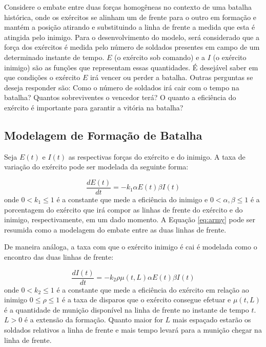 \documentclass{article}
\begin{document}
Considere o embate entre duas forças homogêneas no contexto de uma batalha histórica, onde os exércitos se alinham um de frente para o outro em formação e mantém a posição atirando e substituindo a linha de frente a medida que esta é atingida pelo inimigo. Para o desenvolvimento do modelo, será considerado que a força dos exércitos é medida pelo número de soldados presentes em campo de um determinado instante de tempo. $E$ (o exército sob comando) e a $I$ (o exército inimigo) são as funções que representam essas quantidades. É desejável saber em que condições o exército $E$ irá vencer ou perder a batalha. Outras perguntas se deseja responder são: Como o número de soldados irá cair com o tempo na batalha? Quantos sobreviventes o vencedor terá? O quanto a eficiência do exército é importante para garantir a vitória na batalha?

\subsection{Modelagem de Formação de Batalha}
\label{sec:model}

Seja $E(t)$ e $I(t)$ as respectivas forças do exército e do inimigo. A taxa de variação do exército pode ser modelada da seguinte forma:

\begin{equation}
	\frac{dE(t)}{dt} = -k_1 \alpha E(t) \beta I(t)
	\label{eq:army}
\end{equation}
onde $0 < k_1 \leq 1$ é a constante que mede a eficiência do inimigo e $0 < \alpha,\beta \leq 1$ é a porcentagem do exército que irá compor as linhas de frente do exército e do inimigo, respectivamente, em um dado momento. A Equação \ref{eq:army} pode ser resumida como a modelagem do embate entre as duas linhas de frente.

De maneira análoga, a taxa com que o exército inimigo é cai é modelada como o encontro das duas linhas de frente:

\begin{equation}
	\frac{dI(t)}{dt} = -k_2 \rho \mu(t,L) \alpha E(t) \beta I(t)
	\label{eq:enemy}
\end{equation}
onde  $0 < k_2 \leq 1$ é a constante que mede a eficiência do exército em relação ao inimigo $0 \leq \rho \leq 1$ é a taxa de disparos que o exército consegue efetuar e $\mu(t,L)$ é a quantidade de munição disponível na linha de frente no instante de tempo $t$. $L > 0$ é a extensão da formação. Quanto maior for $L$ mais espaçado estarão os soldados relativos a linha de frente e mais tempo levará para a munição chegar na linha de frente.
\end{document}
